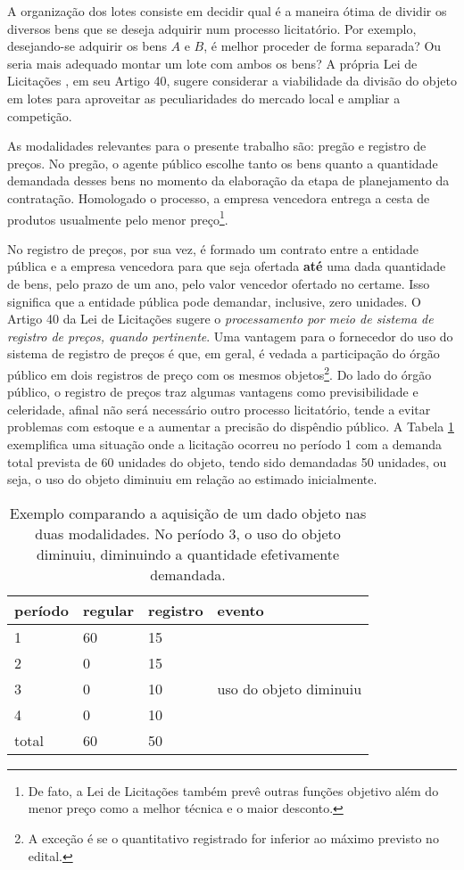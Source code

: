 A organização dos lotes consiste em decidir qual é a maneira ótima de dividir os diversos bens que se deseja adquirir num processo licitatório. Por exemplo, desejando-se adquirir os bens $A$ e $B$, é melhor proceder de forma separada? Ou seria mais adequado montar um lote com ambos os bens? A própria Lei de Licitações \citep{lei14133}, em seu Artigo 40, sugere considerar a viabilidade da divisão do objeto em lotes para aproveitar as peculiaridades do mercado local e ampliar a competição.

As modalidades relevantes para o presente trabalho são: pregão e registro de preços. No pregão, o agente público escolhe tanto os bens quanto a quantidade demandada desses bens no momento da elaboração da etapa de planejamento da contratação. Homologado o processo, a empresa vencedora entrega a cesta de produtos usualmente pelo menor preço\footnote{De fato, a Lei de Licitações também prevê outras funções objetivo além do menor preço como a melhor técnica e o maior desconto.}.

No registro de preços, por sua vez, é formado um contrato entre a entidade pública e a empresa vencedora para que seja ofertada \textbf{até} uma dada quantidade de bens, pelo prazo de um ano, pelo valor vencedor ofertado no certame. Isso significa que a entidade pública pode demandar, inclusive, zero unidades. O Artigo 40 da Lei de Licitações sugere o \emph{processamento por meio de sistema de registro de preços, quando pertinente}. Uma vantagem para o fornecedor do uso do sistema de registro de preços é que, em geral, é vedada a participação do órgão público em dois registros de preço com os mesmos objetos\footnote{A exceção é se o quantitativo registrado for inferior ao máximo previsto no edital.}. Do lado do órgão público, o registro de preços traz algumas vantagens como previsibilidade e celeridade, afinal não será necessário outro processo licitatório, tende a evitar problemas com estoque e a aumentar a precisão do dispêndio público. A Tabela \ref{tab:tabela1} exemplifica uma situação onde a licitação ocorreu no período 1 com a demanda total prevista de 60 unidades do objeto, tendo sido demandadas 50 unidades, ou seja, o uso do objeto diminuiu em relação ao estimado inicialmente.

\begin{table}[]
\centering
\begin{tabular}{@{}llll@{}}
\toprule
período & regular & registro & evento                 \\ \midrule
1       & 60      & 15       &                        \\
2       & 0       & 15       &                        \\
3       & 0       & 10       & uso do objeto diminuiu \\
4       & 0       & 10       &                        \\
total   & 60      & 50       &                        \\ \bottomrule
\end{tabular}
\caption{Exemplo comparando a aquisição de um dado objeto nas duas modalidades. No período 3, o uso do objeto diminuiu, diminuindo a quantidade efetivamente demandada.}
\label{tab:tabela1}
\end{table}

